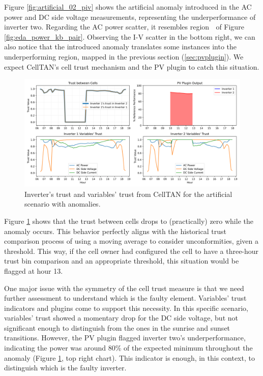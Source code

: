 Figure \ref{fig:artificial_02_piv} shows the artificial anomaly introduced in the AC power and DC side voltage measurements, representing the underperformance of inverter two. Regarding the AC power scatter, it resembles region \textcircled{} of Figure \ref{fig:eda_power_kb_pair}. Observing the I-V scatter in the bottom right, we can also notice that the introduced anomaly translates some instances into the underperforming region, mapped in the previous section (\ref{sec:pvplugin}).
We expect CellTAN's cell trust mechanism and the PV plugin to catch this situation.

\begin{figure}[h!]
    \centering
    \includegraphics[width=\textwidth]{figures/chapter5/results/artificial/43_results_test_clone_02-1.png}
    \caption{Inverter's trust and variables' trust from CellTAN for the artificial scenario with anomalies.}
    \label{fig:artificial_results_02}
\end{figure}

Figure \ref{fig:artificial_results_02} shows that the trust between cells drops to (practically) zero while the anomaly occurs. This behavior perfectly aligns with the historical trust comparison process of using a moving average to consider unconformities, given a threshold. This way, if the cell owner had configured the cell to have a three-hour trust bin comparison and an appropriate threshold, this situation would be flagged at hour 13.

One major issue with the symmetry of the cell trust measure is that we need further assessment to understand which is the faulty element. Variables' trust indicators and plugins come to support this necessity. In this specific scenario, variables' trust showed a momentary drop for the DC side voltage, but not significant enough to distinguish from the ones in the sunrise and sunset transitions. However, the PV plugin flagged inverter two's underperformance, indicating the power was around 80\% of the expected minimum throughout the anomaly (Figure \ref{fig:artificial_results_02}, top right chart). This indicator is enough, in this context, to distinguish which is the faulty inverter.


